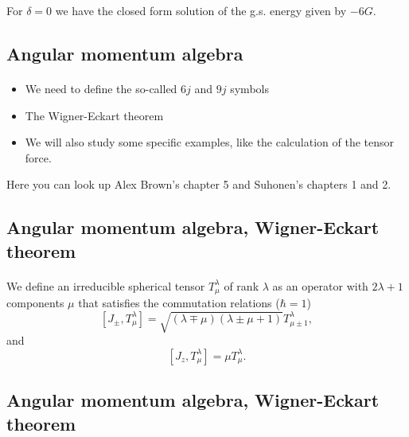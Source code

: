 \documentclass[%
twoside,                 %
final,                   %
10pt]{article}
\begin{document}
For $\delta = 0$ we have the closed form solution of  the g.s. energy given by $-6G$.





\subsection{Angular momentum algebra}

\paragraph{}
\begin{itemize}
\item We need to define the so-called $6j$ and $9j$ symbols

\item The Wigner-Eckart theorem

\item We will also study  some specific examples, like the calculation of the tensor force.
\end{itemize}

\noindent
Here you can look up Alex Brown's chapter 5 and Suhonen's chapters 1 and 2.




\subsection{Angular momentum algebra, Wigner-Eckart theorem}

\paragraph{}
We define an irreducible  spherical tensor $T^{\lambda}_{\mu}$ of rank $\lambda$ as an operator with $2\lambda+1$ components $\mu$ 
that satisfies the commutation relations ($\hbar=1$)
\[
[J_{\pm}, T^{\lambda}_{\mu}]= \sqrt{(\lambda\mp \mu)(\lambda\pm \mu+1)}T^{\lambda}_{\mu\pm 1},
\]
and
\[
[J_{z}, T^{\lambda}_{\mu}]=\mu T^{\lambda}_{\mu}.
\]




\subsection{Angular momentum algebra, Wigner-Eckart theorem}
\end{document}
